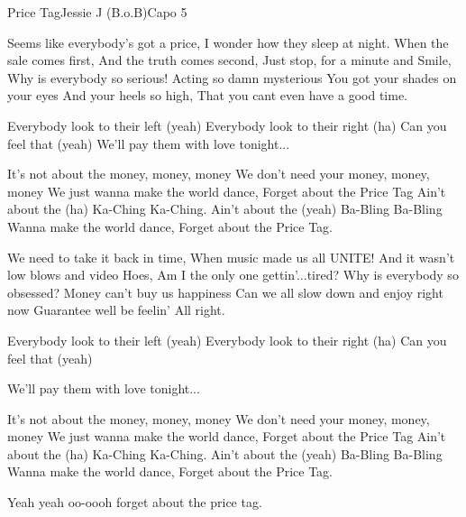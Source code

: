 \begin{song}{Price Tag}{Jessie J (B.o.B)}{Capo 5}


Seems like everybody's got a price, I wonder how they sleep at night.
When the sale comes first,
And the truth comes second,
Just stop, for a minute and
Smile, Why is everybody so serious!
Acting so damn mysterious
You got your shades on your eyes
And your heels so high, That you cant even have a good time.

Everybody look to their left (yeah) Everybody look to their right (ha)
Can you feel that (yeah)
We'll pay them with love tonight...

It's not about the money, money, money
We don't need your money, money, money
We just wanna make the world dance, Forget about the Price Tag
Ain't about the (ha) Ka-Ching Ka-Ching.
Ain't about the (yeah) Ba-Bling Ba-Bling
Wanna make the world dance, Forget about the Price Tag.

We need to take it back in time, When music made us all UNITE!
And it wasn't low blows and video Hoes, Am I the only one gettin'...tired?
Why is everybody so obsessed? Money can't buy us happiness
Can we all slow down and enjoy right now
Guarantee well be feelin'
All right.

Everybody look to their left (yeah) Everybody look to their right (ha)
Can you feel that (yeah)

We'll pay them with love tonight...

It's not about the money, money, money
We don't need your money, money, money
We just wanna make the world dance, Forget about the Price Tag
Ain't about the (ha) Ka-Ching Ka-Ching.
Ain't about the (yeah) Ba-Bling Ba-Bling
Wanna make the world dance, Forget about the Price Tag.


Yeah yeah oo-oooh
forget about the price tag.
\end{song}
